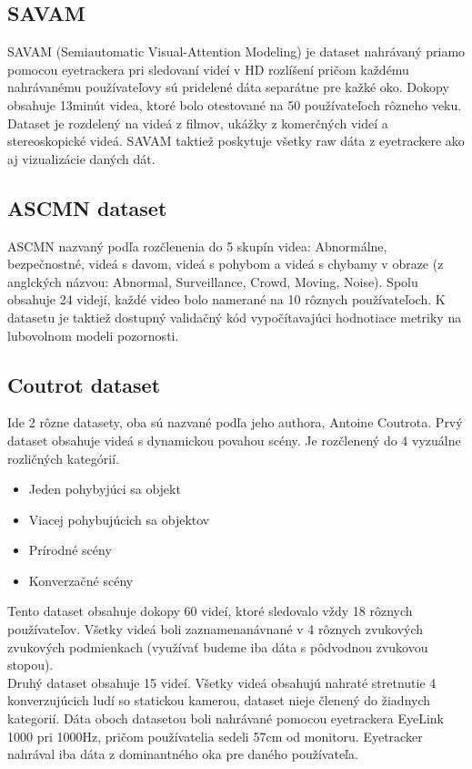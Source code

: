 \subsection{SAVAM}
SAVAM (Semiautomatic Visual-Attention Modeling) je dataset nahrávaný priamo pomocou eyetrackera pri sledovaní videí v HD rozlíšení pričom každému nahrávanému používateľovy sú pridelené dáta separátne pre kažké oko.
Dokopy obsahuje 13minút videa, ktoré bolo otestované na 50 používateľoch rôzneho veku.
Dataset je rozdelený na videá z filmov, ukážky z komerčných videí a stereoskopické videá.
SAVAM taktiež poskytuje všetky raw dáta z eyetrackere ako aj vizualizácie daných dát\cite{savam}.

\subsection{ASCMN dataset}
ASCMN nazvaný podľa rozčlenenia do 5 skupín videa: Abnormálne, bezpečnostné, videá s davom, videá s pohybom a videá s chybamy v obraze (z anglckých názvou: Abnormal, Surveillance, Crowd, Moving, Noise).
Spolu obsahuje 24 videjí, každé video bolo namerané na 10 rôznych používateľoch.
K datasetu je taktiež dostupný validačný kód\cite{accv} vypočítavajúci hodnotiace metriky na lubovolnom modeli pozornosti.

\subsection{Coutrot dataset}
Ide 2 rôzne datasety, oba sú nazvané podľa jeho authora, Antoine Coutrota.
Prvý dataset\cite{sound-1} obsahuje videá s dynamickou povahou scény.
Je rozčlenený do 4 vyzuálne rozličných kategórií.
\begin{itemize}
  \item Jeden pohybyjúci sa objekt
  \item Viacej pohybujúcich sa objektov
  \item Prírodné scény
  \item Konverzačné scény
\end{itemize}
Tento dataset obsahuje dokopy 60 videí, ktoré sledovalo vždy 18 rôznych používateľov.
Všetky videá boli zaznamenanávnané v 4 rôznych zvukových zvukových podmienkach (využívať budeme iba dáta s pôdvodnou zvukovou stopou). \\
Druhý dataset \cite{coutrot-database-2} obsahuje 15 videí.
Všetky videá obsahujú nahraté stretnutie 4 konverzujúcich ludí so statickou kamerou, dataset nieje členený do žiadnych kategorií.
Dáta oboch datasetou boli nahrávané pomocou eyetrackera EyeLink 1000 pri 1000Hz, pričom používatelia sedeli 57cm od monitoru.
Eyetracker nahrával iba dáta z dominantného oka pre daného používateľa.

